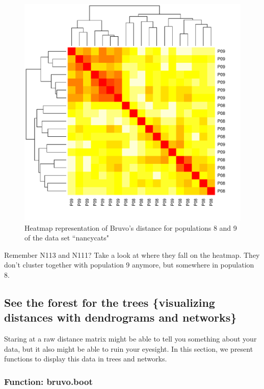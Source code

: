 \documentclass[letterpaper]{article}\usepackage[]{graphicx}\usepackage[]{color}
\newenvironment{knitrout}{}{} %
\newcommand{\tab}{\hspace*{1em}}
\begin{document}
\begin{figure}[h!]
  \centering
  \caption{\footnotesize Heatmap representation of Bruvo's distance for populations 8 and 9 of the data set ``nancycats"}
  \label{bruvo_heat_map_8to9}
\begin{knitrout}\footnotesize
{}\color{fgcolor}

{\centering \includegraphics[width=0.5\linewidth]{figure/popcompare_bruvo2} 

}



\end{knitrout}

\end{figure}

Remember N113 and N111? Take a look at where they fall on the heatmap. They don't cluster together with population 9 anymore, but somewhere in population 8.

%
\subsection{See the forest for the trees \{visualizing distances with dendrograms and networks\}}
\label{index:trees}

\tab\tab Staring at a raw distance matrix might be able to tell you something about your data, but it also might be able to ruin your eyesight. In this section, we present functions to display this data in trees and networks. 

\subsubsection{Function: bruvo.boot}
\label{index:trees:bruvo.boot}
\end{document}
